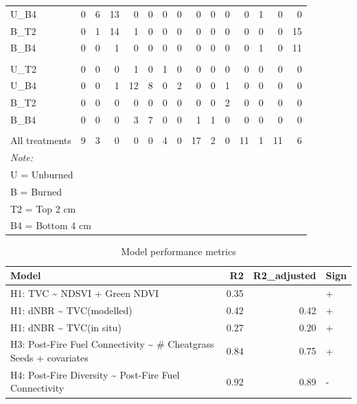 \documentclass[
  11pt,
]{article}
\begin{document}
\begin{table}[!h]
{\begin{tabular}[t]{lrrrrrrrrrrrrrr}
\hspace{1em}U\_B4 & 0 & 6 & 13 & 0 & 0 & 0 & 0 & 0 & 0 & 0 & 0 & 1 & 0 & 0\\
\hspace{1em}B\_T2 & 0 & 1 & 14 & 1 & 0 & 0 & 0 & 0 & 0 & 0 & 0 & 0 & 0 & 15\\
\hspace{1em}B\_B4 & 0 & 0 & 1 & 0 & 0 & 0 & 0 & 0 & 0 & 0 & 0 & 1 & 0 & 11\\
\addlinespace[0.3em]
\multicolumn{15}{l}{\textit{\textbf{M. gracilis}}}\\
\hspace{1em}U\_T2 & 0 & 0 & 0 & 1 & 0 & 1 & 0 & 0 & 0 & 0 & 0 & 0 & 0 & 0\\
\hspace{1em}U\_B4 & 0 & 0 & 1 & 12 & 8 & 0 & 2 & 0 & 0 & 1 & 0 & 0 & 0 & 0\\
\hspace{1em}B\_T2 & 0 & 0 & 0 & 0 & 0 & 0 & 0 & 0 & 0 & 2 & 0 & 0 & 0 & 0\\
\hspace{1em}B\_B4 & 0 & 0 & 0 & 3 & 7 & 0 & 0 & 1 & 1 & 0 & 0 & 0 & 0 & 0\\
\addlinespace[0.3em]
\multicolumn{15}{l}{\textbf{Other species}}\\
\hspace{1em}All treatments & 9 & 3 & 0 & 0 & 0 & 4 & 0 & 17 & 2 & 0 & 11 & 1 & 11 & 6\\
\bottomrule
\multicolumn{15}{l}{\rule{0pt}{1em}\textit{Note: }}\\
\multicolumn{15}{l}{\rule{0pt}{1em}U = Unburned}\\
\multicolumn{15}{l}{\rule{0pt}{1em}B = Burned}\\
\multicolumn{15}{l}{\rule{0pt}{1em}T2 = Top 2 cm}\\
\multicolumn{15}{l}{\rule{0pt}{1em}B4 = Bottom 4 cm}\\
\end{tabular}}
\end{table}

\newpage

\begin{table}

\caption{\label{tab:unnamed-chunk-3}Model performance metrics}
\centering
\fontsize{8}{10}\selectfont
\begin{tabular}[t]{lrrl}
\toprule
Model & R2 & R2\_adjusted & Sign\\
\midrule
H1: TVC \textasciitilde{} NDSVI + Green NDVI & 0.35 &  & +\\
H1: dNBR \textasciitilde{} TVC(modelled) & 0.42 & 0.42 & +\\
H1: dNBR \textasciitilde{} TVC(in situ) & 0.27 & 0.20 & +\\
H3: Post-Fire Fuel Connectivity \textasciitilde{} \# Cheatgrass Seeds + covariates & 0.84 & 0.75 & +\\
H4: Post-Fire Diversity \textasciitilde{} Post-Fire Fuel Connectivity & 0.92 & 0.89 & -\\
\bottomrule
\end{tabular}
\end{table}
\end{document}
